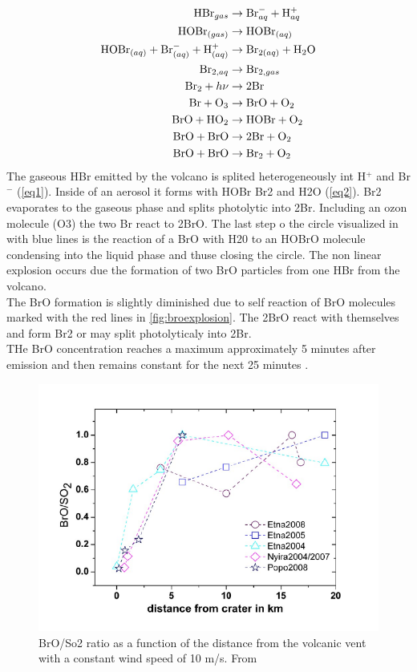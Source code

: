 \documentclass  [
  paper    = a4,
  BCOR     = 10mm,
  twoside,
  fontsize = 12pt,
  fleqn,
  toc      = bibnumbered,
  toc      = listofnumbered,
  numbers  = noendperiod,
  headings = normal,
  listof   = leveldown,
  version  = 3.03
]                                       {scrreprt}
\begin{document}
\begin{align}
\ce{HBr}_{gas} &\rightarrow \ce{Br}^{-}_{aq} + \ce{H}^{+}_{aq} \label{eq1}\\
\ce{HOBr}_{(gas)} &\rightarrow \ce{HOBr}_{(aq)} \\
\ce{HOBr}_{(aq)} + \ce{Br}^{-}_{(aq)} + \ce{H}^{+}_{(aq)} &\rightarrow
\ce{Br}_{2(aq)} +  \ce{H2O}\label{eq2}\\
\ce{Br}_{2,aq} &\rightarrow \ce{Br}_{2,gas} \\
\ce{Br2} + h\nu &\rightarrow 2 \ce{Br} \\
\ce{Br} + \ce{O3} &\rightarrow \ce{BrO} + \ce{O2} \\
\ce{BrO} + \ce{HO2} &\rightarrow \ce{HOBr} + \ce{O2} \\
\ce{BrO} + \ce{BrO} &\rightarrow 2 \ce{Br} + \ce{O2} \\
\ce{BrO} + \ce{BrO} &\rightarrow \ce{Br2} + \ce{O2}
\end{align}
The gaseous HBr emitted by the volcano is splited heterogeneously int H$^{+}$ and Br$^{-}$ (\cref{eq1}). Inside of an aerosol it forms with HOBr Br2 and H2O (\cref{eq2}). Br2 evaporates to the gaseous phase and splits photolytic  into 2Br. Including an ozon molecule (O3) the two Br react to 2BrO. The last step o the circle visualized in  with blue lines is the reaction of a BrO with H20 to an HOBrO molecule condensing into the liquid phase  and thuse closing the circle. The non linear explosion occurs due the formation of two BrO particles from one HBr from the volcano.\\
The BrO formation is slightly diminished due to self reaction of BrO molecules marked with the red lines in \cref{fig:broexplosion}. The 2BrO react with themselves and form Br2 or may split photolyticaly into 2Br.\\
THe BrO concentration reaches a maximum approximately 5 minutes after emission and then remains constant for the next 25 minutes \citet{lubcke2014bro}.
 \begin{figure}
 	\centering
 	\includegraphics[width=0.7\linewidth]{Bilder/rat_diff}
 	\caption{BrO/So2 ratio as a function of the distance from the volcanic vent with a constant wind speed of 10 m/s. From \cite{lubcke2014optical}}
 	\label{fig:ratdiff}
 \end{figure}
 
\end{document}
